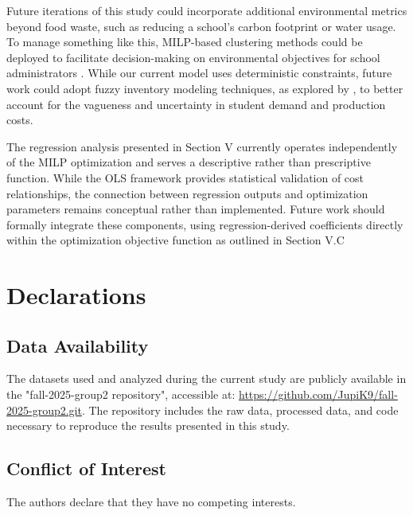 \documentclass[journal]{IEEEtran}
\begin{document}
Future iterations of this study could incorporate additional environmental metrics beyond food waste, such as reducing a school's carbon footprint or water usage. To manage something like this, MILP-based clustering methods could be deployed to facilitate decision-making on environmental objectives for school administrators \cite{oliva}. While our current model uses deterministic constraints, future work could adopt fuzzy inventory modeling techniques, as explored by \cite{kalaiarasi}, to better account for the vagueness and uncertainty in student demand and production costs.

The regression analysis presented in Section V currently operates independently of the MILP optimization and serves a descriptive rather than prescriptive function. While the OLS framework provides statistical validation of cost relationships, the connection between regression outputs and optimization parameters remains conceptual rather than implemented. Future work should formally integrate these components, using regression-derived coefficients directly within the optimization objective function as outlined in Section V.C

\section{Declarations}

\subsection*{Data Availability}

The datasets used and analyzed during the current study are publicly available in the "fall-2025-group2 repository", accessible at: \url{https://github.com/JupiK9/fall-2025-group2.git}. The repository includes the raw data, processed data, and code necessary to reproduce the results presented in this study.

\subsection*{Conflict of Interest}
The authors declare that they have no competing interests.


\balance

\end{document}
